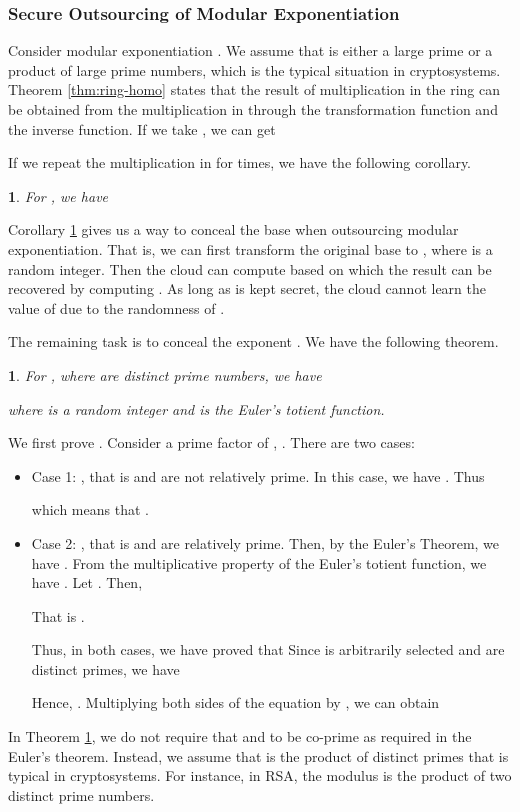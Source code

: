 \documentclass[english,draftcls,onecolumn,11pt]{IEEEtran}
\theoremstyle{definition}
\theoremstyle{plain}
\newtheorem{thm}{\protect\theoremname}
\theoremstyle{plain}
\newtheorem{cor}{\protect\corollaryname}
\theoremstyle{definition}
\providecommand{\corollaryname}{Corollary}
\providecommand{\theoremname}{Theorem}
\begin{document}
\subsubsection{Secure Outsourcing of Modular Exponentiation}

Consider modular exponentiation . We assume that
 is either a large prime or a product of large prime numbers,
which is the typical situation in cryptosystems. Theorem \ref{thm:ring-homo}
states that the result of multiplication in the ring 
can be obtained from the multiplication in  through
the transformation function and the inverse function. If we take ,
we can get

If we repeat the multiplication in  for  times,
we have the following corollary.
\begin{cor}
\label{cor:exponentiation} For , we have


\end{cor}
Corollary \ref{cor:exponentiation} gives us a way to conceal the
base when outsourcing modular exponentiation. That is, we can first
transform the original base  to , where 
is a random integer. Then the cloud can compute  based
on which the result can be recovered by computing .
As long as  is kept secret, the cloud cannot learn the value of
 due to the randomness of . 

The remaining task is to conceal the exponent . We have the following
theorem.
\begin{thm}
\label{thm:euler} For , where 
are distinct prime numbers, we have

where  is a random integer and  is the Euler's totient
function.\end{thm}
\begin{IEEEproof}
We first prove . Consider a prime
factor  of , . There are two cases:
\begin{itemize}
\item Case 1: , that is  and
 are not relatively prime. In this case, we have .
Thus

which means that .
\item Case 2: , that is  and  are relatively
prime. Then, by the Euler's Theorem, we have .
From the multiplicative property of the Euler's totient function,
we have . Let .
Then,




That is . 


Thus, in both cases, we have proved that 
Since  is arbitrarily selected and 
are distinct primes, we have




Hence, . Multiplying both sides of
the equation by , we can obtain



\end{itemize}
\end{IEEEproof}
In Theorem \ref{thm:euler}, we do not require that  and 
to be co-prime as required in the Euler's theorem. Instead, we assume
that  is the product of distinct primes that is typical in cryptosystems.
For instance, in RSA, the modulus  is the product of two distinct
prime numbers.
\end{document}
